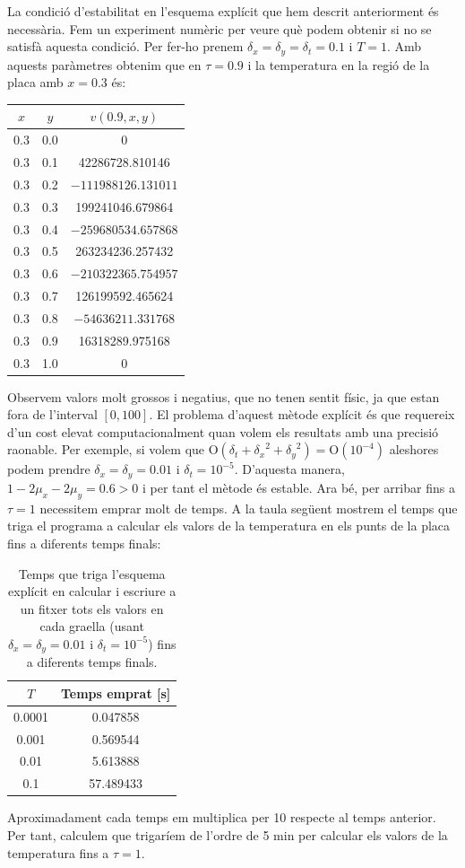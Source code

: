 \documentclass[10pt,a4paper]{article}
\renewcommand{\O}[1]{\mathrm{O}\left(#1\right)} %
\theoremstyle{definition}
\theoremstyle{remark}
\begin{document}
La condició d'estabilitat en l'esquema explícit que hem descrit anteriorment és necessària. Fem un experiment numèric per veure què podem obtenir si no se satisfà aquesta condició. Per fer-ho prenem $\delta_x=\delta_y=\delta_t=0.1$ i $T=1$. Amb aquests paràmetres obtenim que en $\tau=0.9$ i la temperatura en la regió de la placa amb $x=0.3$ és:
\begin{table}[ht]
  \centering
  \begin{tabular}{c|c|c}
    $x$ & $y$ & $v(0.9,x,y)$        \\ \hline\hline
    0.3 & 0.0 & 0                   \\
    0.3 & 0.1 & 42286728.810146     \\
    0.3 & 0.2 & $-111988126.131011$ \\
    0.3 & 0.3 & 199241046.679864    \\
    0.3 & 0.4 & $-259680534.657868$ \\
    0.3 & 0.5 & 263234236.257432    \\
    0.3 & 0.6 & $-210322365.754957$ \\
    0.3 & 0.7 & 126199592.465624    \\
    0.3 & 0.8 & $-54636211.331768$  \\
    0.3 & 0.9 & 16318289.975168     \\
    0.3 & 1.0 & 0                   \\
  \end{tabular}
\end{table}
Observem valors molt grossos i negatius, que no tenen sentit físic, ja que estan fora de l'interval $[0,100]$.
El problema d'aquest mètode explícit és que requereix d'un cost elevat computacionalment quan volem els resultats amb una precisió raonable. Per exemple, si volem que $\O{\delta_t + {\delta_x}^2 + {\delta_y}^2} = \O{10^{-4}}$ aleshores podem prendre $\delta_x= \delta_y=0.01$ i $\delta_t=10^{-5}$. D'aquesta manera, $1-2\mu_x-2\mu_y = 0.6>0$ i per tant el mètode és estable. Ara bé, per arribar fins a $\tau=1$ necessitem emprar molt de temps. A la taula següent mostrem el temps que triga el programa a calcular els valors de la temperatura en els punts de la placa fins a diferents temps finals:
\begin{table}[ht]
  \centering
  \begin{tabular}{c|c}
    $T$    & Temps emprat [s] \\ \hline\hline
    0.0001 & 0.047858         \\
    0.001  & 0.569544         \\
    0.01   & 5.613888         \\
    0.1    & 57.489433        \\
  \end{tabular}
  \caption{Temps que triga l'esquema explícit en calcular i escriure a un fitxer tots els valors en cada graella (usant $\delta_x= \delta_y=0.01$ i $\delta_t=10^{-5}$) fins a diferents temps finals.}
\end{table}
Aproximadament cada temps em multiplica per 10 respecte al temps anterior. Per tant, calculem que trigaríem de l'ordre de 5 min per calcular els valors de la temperatura fins a $\tau=1$.\vspace{0.25cm}
\end{document}
